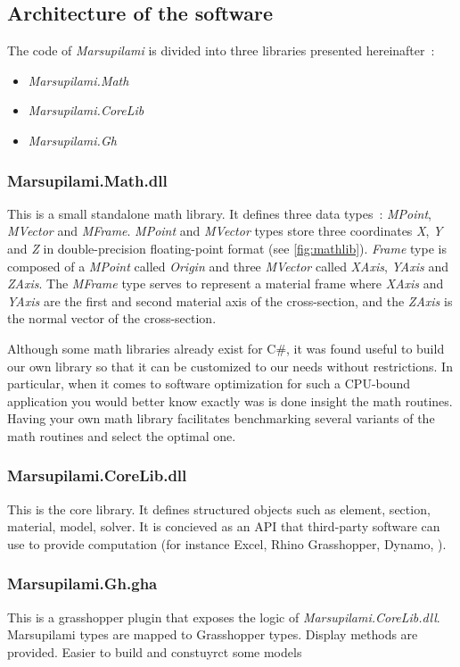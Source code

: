\subsection{Architecture of the software}
The code of \emph{Marsupilami} is divided into three libraries presented hereinafter~: 
\begin{itemize}
\item \textit{Marsupilami.Math}
\item \textit{Marsupilami.CoreLib} 
\item \textit{Marsupilami.Gh}
\end{itemize}

\subsubsection{Marsupilami.Math.dll}
This is a small standalone math library. It defines three data types~: \textit{MPoint}, \textit{MVector} and \textit{MFrame}. \textit{MPoint} and \textit{MVector} types store three coordinates \textit{X}, \textit{Y} and \textit{Z} in double-precision floating-point format (see \cref{fig:mathlib}). \textit{Frame} type is composed of a \textit{MPoint} called \textit{Origin} and three \textit{MVector} called \textit{XAxis}, \textit{YAxis} and \textit{ZAxis}. The \textit{MFrame} type serves to represent a material frame where \textit{XAxis} and \textit{YAxis} are the first and second material axis of the cross-section, and the \textit{ZAxis} is the normal vector of the cross-section.

Although some math libraries already exist for C\#, it was found useful to build our own library so that it can be customized to our needs without restrictions. In particular, when it comes to software optimization for such a CPU-bound application you would better know exactly was is done insight the math routines. Having your own math library facilitates benchmarking several variants of the math routines and select the optimal one.

\subsubsection{Marsupilami.CoreLib.dll}
This is the core library. It defines structured objects such as element, section, material, model, solver. It is concieved as an API that third-party software can use to provide computation (for instance Excel, Rhino Grasshopper, Dynamo, \telp{}).

\subsubsection{Marsupilami.Gh.gha}
This is a grasshopper plugin that exposes the logic of \textit{Marsupilami.CoreLib.dll}. Marsupilami types are mapped to Grasshopper types. Display methods are provided. Easier to build and constuyrct some models

